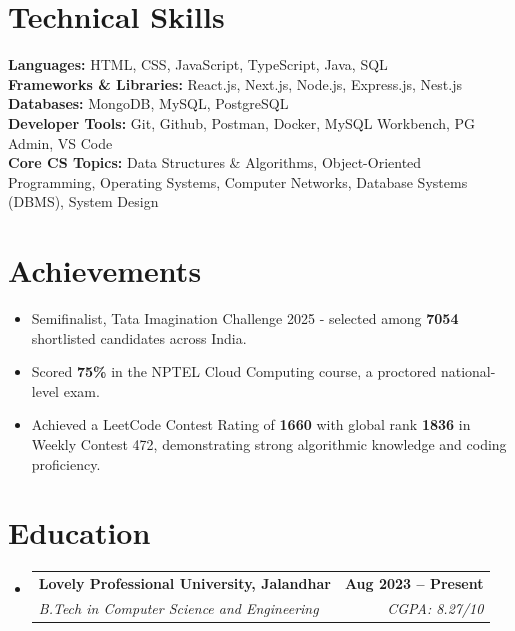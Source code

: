 \documentclass[letterpaper,11pt]{article}
\makeatletter
\newcommand{\resumeItem}[1]{
      \item\small{
        {#1 \vspace{-2pt}}
      }
    }
\newcommand{\resumeSubheading}[4]{
      \vspace{-2pt}\item
        \begin{tabular*}{1.0\textwidth}[t]{l@{\extracolsep{\fill}}r}
          \textbf{#1} & \textbf{\small #2} \\
          \textit{\small#3} & \textit{\small #4} \\
        \end{tabular*}\vspace{-7pt}
    }
\newcommand{\resumeSubHeadingListStart}{\begin{itemize}[leftmargin=0.0in, label={}]}
\newcommand{\resumeSubHeadingListEnd}{\end{itemize}}
\newcommand{\resumeItemListStart}{\begin{itemize}}
\newcommand{\resumeItemListEnd}{\end{itemize}\vspace{-5pt}}
\makeatother
\begin{document}
\section{Technical Skills}
\begin{itemize}[leftmargin=0.15in, label={}]
    \small{\item{
        \textbf{Languages:} HTML, CSS, JavaScript, TypeScript, Java, SQL \\
        \textbf{Frameworks \& Libraries:} React.js, Next.js, Node.js, Express.js, Nest.js \\
        \textbf{Databases:} MongoDB, MySQL, PostgreSQL \\
        \textbf{Developer Tools:} Git, Github, Postman, Docker, MySQL Workbench, PG Admin, VS Code \\
        \textbf{Core CS Topics:} Data Structures \& Algorithms, Object-Oriented Programming, Operating Systems, Computer Networks, Database Systems (DBMS), System Design \\
    }}
\end{itemize}

    
     \vspace{-12pt}
    
    
    \section{Achievements}
    \resumeSubHeadingListStart
        \resumeItemListStart

            \resumeItem{Semifinalist, Tata Imagination Challenge 2025 - selected among \textbf{7054} shortlisted candidates across India.}
            \resumeItem{Scored \textbf{75\%} in the NPTEL Cloud Computing course, a proctored national-level exam.}
            \resumeItem{Achieved a LeetCode Contest Rating of \textbf{1660} with global rank \textbf{1836} in Weekly Contest 472, demonstrating strong algorithmic knowledge and coding proficiency.}

        \resumeItemListEnd
    \resumeSubHeadingListEnd



\vspace{-12pt}



    \section{Education}
      \resumeSubHeadingListStart
 \resumeSubheading
          {Lovely Professional University, Jalandhar}{Aug 2023 -- Present}
          {B.Tech in Computer Science and Engineering} {CGPA: 8.27/10}
      \resumeSubHeadingListEnd
    
    
    
    
\end{document}
